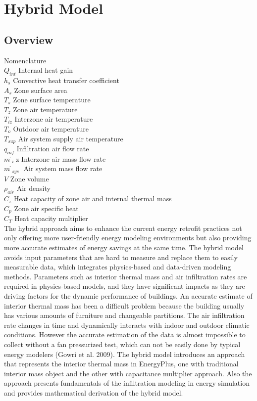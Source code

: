 \section{Hybrid Model}\label{hybrid-model}

\subsection{Overview}\label{overview-004}

Nomenclature\\
$Q_{int}$	Internal heat gain\\
$h_s$	Convective heat transfer coefficient\\
$A_s$	Zone surface area\\
$T_s$	Zone surface temperature\\
$T_z$	Zone air temperature\\
$T_{iz}$	Interzone air temperature\\
$T_o$	Outdoor air temperature\\
$T_{sup}$	Air system supply air temperature\\
$q_{inf}$	Infiltration air flow rate\\
$m ̇_i$z	Interzone air mass flow rate\\
$m ̇_{sys}$	Air system mass flow rate\\
$V$	Zone volume\\
$ρ_{air}$	Air density\\
$C_z$	Heat capacity of zone air and internal thermal mass\\
$C_p$	Zone air specific heat\\
$C_T$	Heat capacity multiplier\\

The hybrid approach aims to enhance the current energy retrofit practices not only offering more user-friendly energy modeling environments but also providing more accurate estimates of energy savings at the same time. The hybrid model avoids input parameters that are hard to measure and replace them to easily measurable data, which integrates physics-based and data-driven modeling methods. Parameters such as interior thermal mass and air infiltration rates are required in physics-based models, and they have significant impacts as they are driving factors for the dynamic performance of buildings. An accurate estimate of interior thermal mass has been a difficult problem because the building usually has various amounts of furniture and changeable partitions. The air infiltration rate changes in time and dynamically interacts with indoor and outdoor climatic conditions. However the accurate estimation of the data is almost impossible to collect without a fan pressurized test, which can not be easily done by typical energy modelers (Gowri et al. 2009). The hybrid model introduces an approach that represents the interior thermal mass in EnergyPlus, one with traditional interior mass object and the other with capacitance multiplier approach. Also the approach presents fundamentals of the infiltration modeling in energy simulation and provides mathematical derivation of the hybrid model. 

